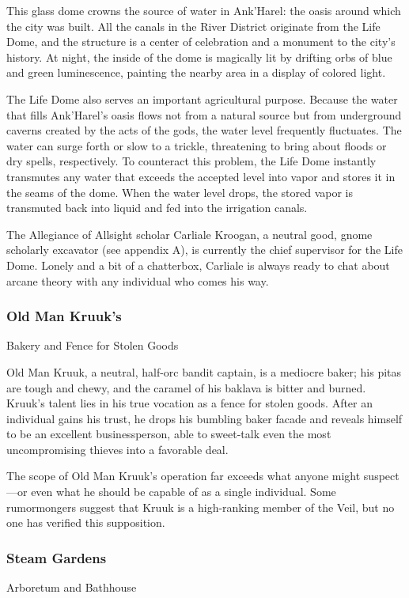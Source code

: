 \documentclass[10pt,a4paper,twoside,twocolumn,openany,nodeprecatedcode]{dndbook}
\begin{document}
This glass dome crowns the source of water in Ank'Harel: the oasis around which the city was built. All the canals in the River District originate from the Life Dome, and the structure is a center of celebration and a monument to the city's history. At night, the inside of the dome is magically lit by drifting orbs of blue and green luminescence, painting the nearby area in a display of colored light.

The Life Dome also serves an important agricultural purpose. Because the water that fills Ank'Harel's oasis flows not from a natural source but from underground caverns created by the acts of the gods, the water level frequently fluctuates. The water can surge forth or slow to a trickle, threatening to bring about floods or dry spells, respectively. To counteract this problem, the Life Dome instantly transmutes any water that exceeds the accepted level into vapor and stores it in the seams of the dome. When the water level drops, the stored vapor is transmuted back into liquid and fed into the irrigation canals.

The Allegiance of Allsight scholar Carliale Kroogan, a neutral good, gnome scholarly excavator (see appendix A), is currently the chief supervisor for the Life Dome. Lonely and a bit of a chatterbox, Carliale is always ready to chat about arcane theory with any individual who comes his way.

\subsubsection{Old Man Kruuk's}
Bakery and Fence for Stolen Goods

Old Man Kruuk, a neutral, half-orc bandit captain, is a mediocre baker; his pitas are tough and chewy, and the caramel of his baklava is bitter and burned. Kruuk's talent lies in his true vocation as a fence for stolen goods. After an individual gains his trust, he drops his bumbling baker facade and reveals himself to be an excellent businessperson, able to sweet-talk even the most uncompromising thieves into a favorable deal.

The scope of Old Man Kruuk's operation far exceeds what anyone might suspect—or even what he should be capable of as a single individual. Some rumormongers suggest that Kruuk is a high-ranking member of the Veil, but no one has verified this supposition.

\subsubsection{Steam Gardens}
Arboretum and Bathhouse
\end{document}
